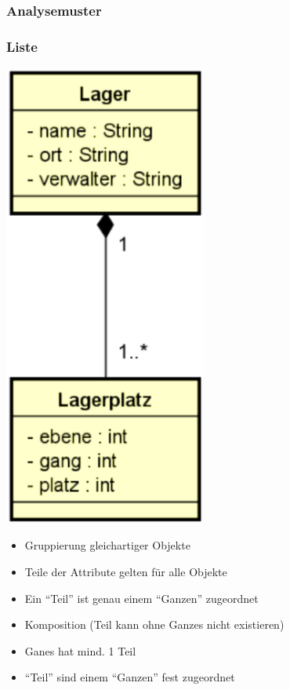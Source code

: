 \documentclass[11pt, a4paper]{article}
\begin{document}
\newpage




\raggedright \subsubsection{Analysemuster}

\subsubsection*{Liste}

\begin{minipage}[h]{0.25\textwidth}
    \centering \includegraphics[width=0.5\textwidth]{Analysemuster-00.png} 
\end{minipage}
\begin{minipage}[h]{0.7\textwidth}
    \raggedleft
    \begin{itemize}
        \item Gruppierung gleichartiger Objekte
        \item Teile der Attribute gelten für alle Objekte
        \item Ein “Teil” ist genau einem “Ganzen” zugeordnet
    \end{itemize}
    \vspace{1em}
    \begin{itemize}
        \item Komposition (Teil kann ohne Ganzes nicht existieren)
        \item Ganes hat mind. 1 Teil
        \item “Teil” sind einem “Ganzen” fest zugeordnet
    \end{itemize}
\end{minipage}
\end{document}
